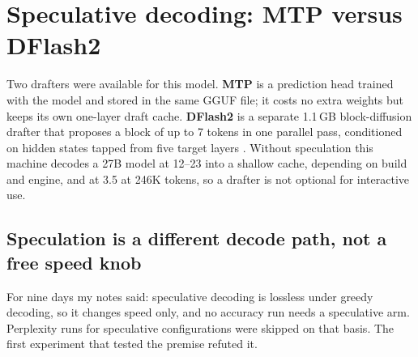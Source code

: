 \section{Speculative decoding: MTP versus DFlash2}\label{sec:spec}

Two drafters were available for this model. \textbf{MTP} is a prediction head trained with the model
and stored in the same GGUF file; it costs no extra weights but keeps its own one-layer 
draft cache. \textbf{DFlash2} is a separate 1.1\,GB block-diffusion drafter that proposes a block of
up to 7 tokens in one parallel pass, conditioned on hidden states tapped from five target layers
\citep{chen2026dflash,incoai2026dflash2_card}. Without speculation this machine decodes a 27B model at
12--23\tps{} into a shallow cache, depending on build and engine, and at 3.5\tps{} at 246K tokens, so a drafter is not optional for
interactive use.

\subsection{Speculation is a different decode path, not a free speed knob}\label{sec:nonequiv}
For nine days my notes said: speculative decoding is lossless under greedy decoding, so it changes
speed only, and no accuracy run needs a speculative arm. Perplexity runs for speculative
configurations were skipped on that basis. The first experiment that tested the premise refuted it.

\begin{table}[t]
\centering\small
\caption{Speculation at context 32{,}768, first battery. \Qsix, greedy (temperature 0, top-$p$ 1, fixed
seed), 1{,}024-token limit, all 164 HumanEval+ problems, zero empty responses. ``Byte-exact'' compares
each completion with the no-speculation baseline. The DFlash2 row ran on a different engine build
(E-B) and an older drafter file, so its equivalence and speed are not comparable with the MTP
rows.}\label{tab:nonequiv}
\end{table}

